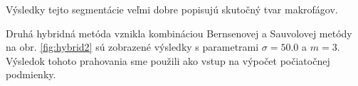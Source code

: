 \documentclass[a4paper,11pt,oneside]{article}%
\begin{document}
Výsledky tejto segmentácie veľmi dobre popisujú skutočný tvar makrofágov.

Druhá hybridná metóda vznikla kombináciou Bernsenovej a Sauvolovej metódy na obr. \ref{fig:hybrid2}  sú zobrazené výsledky s parametrami $\sigma = 50.0$ a $m = 3$. Výsledok tohoto prahovania sme použili ako vstup na výpočet počiatočnej podmienky. 

\begin{figure}[H]  
    \hspace{5px}

\end{figure}
\end{document}

